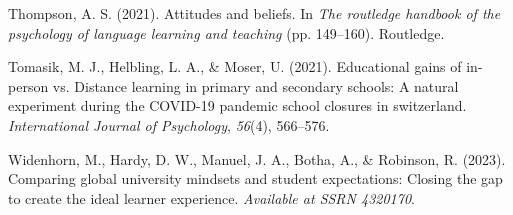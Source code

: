 \documentclass[
  man]{apa6}
\newlength{\cslhangindent}
\newlength{\cslentryspacingunit} %
\newenvironment{CSLReferences}[2] %
 {%
  \setlength{\parindent}{0pt}
  \ifodd #1
  \let\oldpar\par
  \def\par{\hangindent=\cslhangindent\oldpar}
  \fi
  \setlength{\parskip}{#2\cslentryspacingunit}
 }%
 {}
\begin{document}
\begin{CSLReferences}{1}{0}
\leavevmode{}%
Thompson, A. S. (2021). Attitudes and beliefs. In \emph{The routledge handbook of the psychology of language learning and teaching} (pp. 149--160). Routledge.

\leavevmode{}%
Tomasik, M. J., Helbling, L. A., \& Moser, U. (2021). Educational gains of in-person vs. Distance learning in primary and secondary schools: A natural experiment during the COVID-19 pandemic school closures in switzerland. \emph{International Journal of Psychology}, \emph{56}(4), 566--576.

\leavevmode{}%
Widenhorn, M., Hardy, D. W., Manuel, J. A., Botha, A., \& Robinson, R. (2023). Comparing global university mindsets and student expectations: Closing the gap to create the ideal learner experience. \emph{Available at SSRN 4320170}.

\end{CSLReferences}
\end{document}
